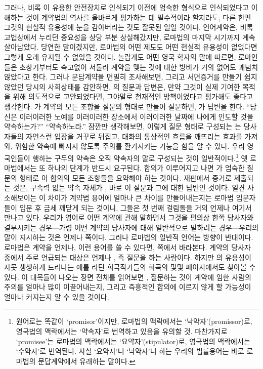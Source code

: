 그러나,
비록 이 유용한 안전장치로 인식되기 이전에
엄숙한 형식으로 인식되었다고 이해하는 것이
계약법의 역사를 올바르게 평가하는 데 필수적이라 할지라도,
다른 한편
그것의 현실적 유용성에 눈을 감아버리는 것도
잘못된 일일 것이다.
언어계약은, 비록 고법상에서 누리던 중요성을
상당 부분 상실해갔지만, 로마법의 마지막 시기까지 계속 살아남았다.
당연한 말이겠지만,
로마법의 어떤 제도도
어떤 현실적 유용성이 없었다면
그렇게 오래 유지될 수 없었을 것이다.
놀랍게도
어떤 영국 학자의 말에 따르면,
로마인들은
초창기부터도
숙고없이 서둘러 계약을 맺는 것에 대한 방비가 거의 없어도
괘념치 않았다고 한다.
그러나 문답계약을 면밀히 조사해보면,
그리고 서면증거를 만들기 쉽지 않았던 당시의 사회상태를 감안하면,
의 질문과 답변은,
만약 그것이 실제 기여한 목적을 위해 의도적으로 고안되었다면,
그야말로 천재적인 방책이었다고 평가해도 좋다고 생각한다.
가
계약의 모든 조항을 질문의 형태로 만들어 질문하면,
가 답변을 한다.
``당신은 이러이러한 노예를 이러이러한 장소에서 이러이러한 날짜에
나에게 인도할 것을 약속하는가?''
``약속하노라.''
잠깐만 생각해보면,
이렇게 질문 형태로 구성되는 는
당사자들의 자연스런 입장을 거꾸로 뒤집고,
대화의 통상적인 흐름을 깨뜨리는 효과를 가져와,
위험한 약속에 빠지지 않도록 주의를 환기시키는 기능을 함을 알 수 있다.
우리 영국인들이 행하는 구두의 약속은
오직 약속자의 말로 구성되는 것이 일반적이다.\footnote{%
  원어로는 똑같이 `promisor'이지만,
  로마법의 맥락에서는 `낙약자'(promissor)로,
  영국법의 맥락에서는 `약속자'로 번역하고 있음을 유의할 것.
  마찬가지로 `promisee'는 로마법의 맥락에서는 `요약자'(stipulator)로,
  영국법의 맥락에서는 `수약자'로 번역된다.
  사실 `요약자'니 `낙약자'니 하는 우리의 법률용어는
  바로 로마법의 문답계약에서 유래하는 말이다.
  }
옛 로마법에서는 또 하나의 단계가 반드시 요구된다.
합의가 이루어지고 나면
가 엄숙한 질문의 형태로 이 합의의 모든 조항들을 요약해야 하는 것이다.
재판에서 증거로 제출되는 것은,
구속력 없는 약속 자체가 ,
바로 이 질문과 그에 대한 답변인 것이다.
일견 사소해보이는 이 차이가
계약법 용어에 얼마나 큰 차이를 만들어내는지는
로마법 입문자들이 입문 후 금세 깨닫게 되는 것이니,
그들은 첫 번째 걸림돌을 거의 언제나 여기서 만나고 있다.
우리가 영어로 어떤 계약에 관해 말하면서
그것을 편의상 한쪽 당사자와 결부시키는 경우---가령
어떤 계약의 당사자에 대해 일반적으로 말하려는 경우---우리의
말이 지시하는 것은 언제나
 쪽이다.
그러나 로마법의 일반적 언어는 방향이 반대이다.
로마법은 계약을 언제나, 이런 용어를 쓸 수 있다면,
 쪽에서 바라본다.
계약의 당사자 중에서
주로 언급되는 대상은 언제나 , 즉
질문을 하는 사람이다.
하지만
의 유용성이 자못 생생하게 드러나는 예를
라틴 희극작가들의 희곡의 몇몇 페이지에서도 찾아볼 수 있다.
이 대목들이 나오는 장면 전체를 읽어보면
,
질문하는 것이 계약에 임한 사람의 주의를 얼마나 많이 이끌어내는지,
그리고
즉흥적인 합의에 이르지 않게 할 가능성이 얼마나 커지는지
알 수 있을 것이다.

